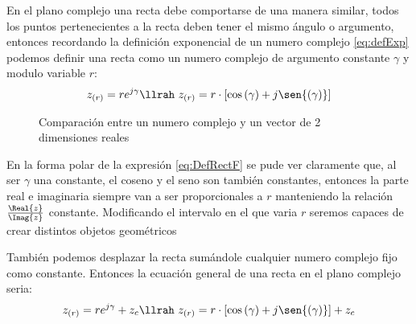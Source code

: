 En el plano complejo una recta debe comportarse de una manera similar, todos los puntos pertenecientes a la recta deben tener el mismo ángulo o argumento, entonces recordando la definición exponencial de un numero complejo \ref{eq:defExp} podemos definir una recta como un numero complejo de argumento constante $\gamma$ y modulo variable $r$:
\begin{equation}\label{eq:DefRectF}
    z_{(r)}=re^{j\gamma}\llrah \ z_{(r)}=r\cdot[\cos{(\gamma)}+j\sen{(\gamma)}] 
\end{equation}
\begin{figure}[H]%
\centering
    \begin{minipage}{0.5\textwidth}
    \centering
        
    \end{minipage}%
    \begin{minipage}{0.4\textwidth}
    \centering
        
    \end{minipage}%
    \caption{Comparación entre un numero complejo y un vector de 2 dimensiones reales}
    \label{fig:compRectasF}
\end{figure}
En la forma polar de la expresión \ref{eq:DefRectF} se pude ver claramente que, al ser $\gamma$ una constante, el coseno y el seno son también constantes, entonces la parte real e imaginaria siempre van a ser proporcionales a $r$ manteniendo la relación $\frac{\Real{z}}{\Imag{z}}$ constante.
Modificando el intervalo en el que varia $r$ seremos capaces de crear distintos objetos geométricos
\begin{figure}[H]
\centering
    \begin{minipage}{0.3\textwidth}
        
    \end{minipage}
    \begin{minipage}{0.3\textwidth}
        
    \end{minipage}
    \begin{minipage}{0.3\textwidth}
        
    \end{minipage}
    \caption{}
    \label{fig:RectaExpoF}
\end{figure}
También podemos desplazar la recta sumándole cualquier numero complejo fijo como constante. Entonces la ecuación general de una recta en el plano complejo seria:
\begin{equation}
    z_{(r)}=re^{j\gamma}+z_c \llrah\ z_{(r)}=r\cdot[\cos{(\gamma)}+j\sen{(\gamma)}]+z_c
\end{equation}
